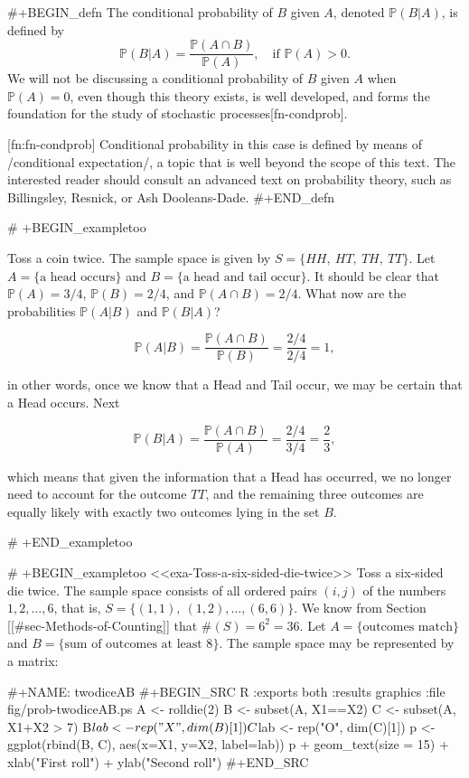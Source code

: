 #+BEGIN_defn
The conditional probability of \(B\) given \(A\), denoted
\(\mathbb{P}(B|A)\), is defined by
\begin{equation}
\mathbb{P}(B|A)=\frac{\mathbb{P}(A\cap B)}{\mathbb{P}(A)},\quad \mbox{if }\mathbb{P}(A)>0.
\end{equation}
We will not be discussing a conditional probability of \(B\) given
\(A\) when \(\mathbb{P}(A)=0\), even though this theory exists, is
well developed, and forms the foundation for the study of stochastic
processes[fn-condprob].

[fn:fn-condprob] Conditional probability in this case is defined by
means of /conditional expectation/, a topic that is well beyond the
scope of this text. The interested reader should consult an advanced
text on probability theory, such as Billingsley, Resnick, or Ash
Dooleans-Dade.
#+END_defn

# +BEGIN_exampletoo

Toss a coin twice. The sample space is given by \(S=\{ HH,\ HT,\ TH,\
TT \} \). Let \(A= \{ \mbox{a head occurs} \} \) and \(B= \{ \mbox{a
head and tail occur} \} \). It should be clear that
\(\mathbb{P}(A)=3/4\), \(\mathbb{P}(B)=2/4\), and \(\mathbb{P}(A\cap
B)=2/4\). What now are the probabilities \(\mathbb{P}(A|B)\) and
\(\mathbb{P}(B|A)\)?  

\[ \mathbb{P}(A|B)=\frac{\mathbb{P}(A\cap
B)}{\mathbb{P}(B)}=\frac{2/4}{2/4}=1, \] 

in other words, once we know that a Head and Tail occur, we may be
certain that a Head occurs. Next

\[ 
\mathbb{P}(B|A)=\frac{\mathbb{P}(A\cap
B)}{\mathbb{P}(A)}=\frac{2/4}{3/4}=\frac{2}{3}, 
\] 

which means that given the information that a Head has occurred, we no
longer need to account for the outcome \(TT\), and the remaining three
outcomes are equally likely with exactly two outcomes lying in the set
\(B\).

# +END_exampletoo


# +BEGIN_exampletoo
<<exa-Toss-a-six-sided-die-twice>> Toss a six-sided die twice. The
sample space consists of all ordered pairs \((i,j)\) of the numbers
\(1,2,\ldots,6\), that is, \( S = \{ (1,1),\ (1,2),\ldots,(6,6) \}
\). We know from Section [[#sec-Methods-of-Counting]] that \( \# (S) =
6^{2} = 36 \). Let \( A = \{ \mbox{outcomes match} \} \) and \( B = \{
\mbox{sum of outcomes at least 8} \} \). The sample space may be
represented by a matrix:

#+NAME: twodiceAB
#+BEGIN_SRC R :exports both :results graphics :file fig/prob-twodiceAB.ps
A <- rolldie(2)
B <- subset(A, X1==X2)
C <- subset(A, X1+X2 > 7)
B$lab <- rep("X", dim(B)[1])
C$lab <- rep("O", dim(C)[1])
p <- ggplot(rbind(B, C), aes(x=X1, y=X2, label=lab))
p + geom_text(size = 15) + xlab("First roll") + ylab("Second roll")
#+END_SRC

